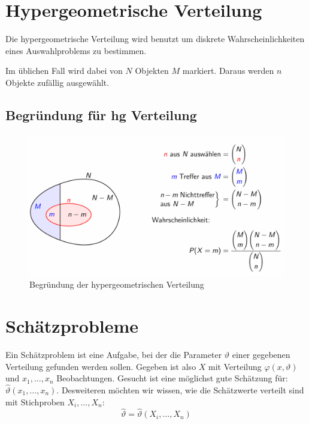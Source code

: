 \documentclass[../Main.tex]{subfiles}
\begin{document}
\newpage
\section{Hypergeometrische Verteilung}
Die hypergeometrische Verteilung wird benutzt um
diskrete Wahrscheinlichkeiten eines Auswahlproblems zu bestimmen.

Im üblichen Fall wird dabei von \(N\) Objekten \(M\) markiert.
Daraus werden \(n\) Objekte zufällig ausgewählt.



\subsection{Begründung für hg Verteilung}
    
\begin{figure}[H]
    \centering
    \includegraphics[width=0.75\linewidth]{Images/begr-hg-verteilung.png}
    \caption{Begründung der hypergeometrischen Verteilung}
\end{figure}


\section{Schätzprobleme}
Ein Schätzproblem ist eine Aufgabe, bei der die Parameter \(\vartheta\) einer gegebenen
Verteilung gefunden werden sollen. Gegeben ist also \(X\) mit Verteilung
\(\varphi(x,\vartheta)\) und \(x_1,\dots,x_n\) Beobachtungen.
Gesucht ist eine möglichst gute Schätzung für: \(\hat{\vartheta}(x_1,\dots,x_n)\).
Desweiteren möchten wir wissen, wie die Schätzwerte verteilt sind mit
Stichproben \(X_i,\dots,X_n\):
\begin{equation}
    \hat{\vartheta} = \hat{\vartheta}(X_i,\dots,X_n)
\end{equation}
\end{document}
